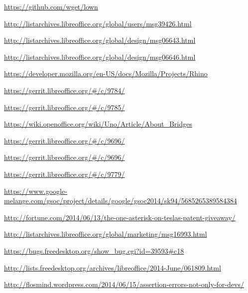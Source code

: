 \documentclass{article}
\begin{document}
\begin{thebibliography}{30}

\url{https://github.com/wget/lown}

    \url{http://listarchives.libreoffice.org/global/users/msg39426.html}

    \url{http://listarchives.libreoffice.org/global/design/msg06643.html}

    \url{http://listarchives.libreoffice.org/global/design/msg06646.html}

    \url{https://developer.mozilla.org/en-US/docs/Mozilla/Projects/Rhino}

    \url{https://gerrit.libreoffice.org/#/c/9784/}

    \url{https://gerrit.libreoffice.org/#/c/9785/}

    \url{https://wiki.openoffice.org/wiki/Uno/Article/About_Bridges}

    \url{https://gerrit.libreoffice.org/#/c/9696/}

    \url{https://gerrit.libreoffice.org/#/c/9696/}

    \url{https://gerrit.libreoffice.org/#/c/9779/}

    \url{https://www.google-melange.com/gsoc/project/details/google/gsoc2014/sk94/5685265389584384}

    \url{http://fortune.com/2014/06/13/the-one-asterisk-on-teslas-patent-giveaway/}

    \url{http://listarchives.libreoffice.org/global/marketing/msg16993.html}

    \url{https://bugs.freedesktop.org/show_bug.cgi?id=39593#c18}

    \url{http://lists.freedesktop.org/archives/libreoffice/2014-June/061809.html}

    \url{http://flosmind.wordpress.com/2014/06/15/assertion-errors-not-only-for-devs/}

\end{thebibliography}
\end{document}
